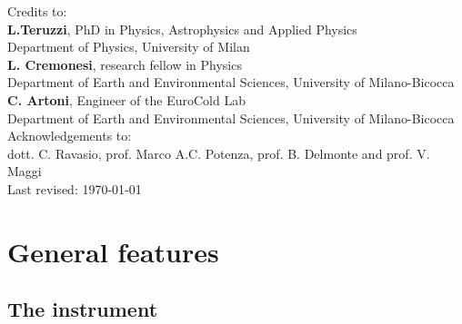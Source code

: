 \documentclass[a4paper, 11pt]{report}
\newcommand\blankpage{%
    \null
    \thispagestyle{empty}%
    \addtocounter{page}{-1}%
    \newpage}
\begin{document}
\newpage
\thispagestyle{empty}
\null{}
\begin{flushleft}
Credits to: \\ \vspace*{0.5 cm}
\textbf{L.Teruzzi}, PhD in Physics, Astrophysics and Applied Physics \\ Department of Physics, University of Milan \\ \vspace*{0.3 cm}
\textbf{L. Cremonesi}, research fellow in Physics \\ Department of Earth and Environmental Sciences, University of Milano-Bicocca \\  \vspace*{0.3 cm} 
\textbf{C. Artoni}, Engineer of the EuroCold Lab \\ Department of Earth and Environmental Sciences, University of Milano-Bicocca \\
\vspace*{4 cm}
Acknowledgements to: \\ dott. C. Ravasio, prof. Marco A.C. Potenza, prof. B. Delmonte and prof. V. Maggi\\
\vspace*{10 cm}
Last revised: \today 
\end{flushleft}
\null

\afterpage{\blankpage}


\newpage
\tableofcontents {}
\newpage
\listoffigures {}
\afterpage{\blankpage}




\newpage
\chapter{General features}
\label{gen_features}


\section{The instrument}
\label{instrument_sect}
\end{document}
